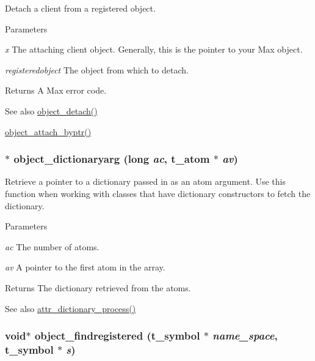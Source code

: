 Detach a client from a registered object. 
\begin{DoxyParams}{Parameters}
\item[{\em x}]The attaching client object. Generally, this is the pointer to your Max object. \item[{\em registeredobject}]The object from which to detach. \end{DoxyParams}
\begin{DoxyReturn}{Returns}
A Max error code.
\end{DoxyReturn}
\begin{DoxySeeAlso}{See also}
\hyperlink{group__obj_ga6765e9533a3ae0d67d302f1e038c66ac}{object\_\-detach()} 

\hyperlink{group__obj_ga76657298bcd43ae4f9098e3ed2b97c72}{object\_\-attach\_\-byptr()} 
\end{DoxySeeAlso}
\hypertarget{group__obj_ga6122e56af8de90fa7aad43ee405c6bb6}{
\subsubsection[{object\_\-dictionaryarg}]{$\ast$ object\_\-dictionaryarg (long {\em ac}, \/  {\bf t\_\-atom} $\ast$ {\em av})}}
\label{group__obj_ga6122e56af8de90fa7aad43ee405c6bb6}


Retrieve a pointer to a dictionary passed in as an atom argument. Use this function when working with classes that have dictionary constructors to fetch the dictionary.


\begin{DoxyParams}{Parameters}
\item[{\em ac}]The number of atoms. \item[{\em av}]A pointer to the first atom in the array. \end{DoxyParams}
\begin{DoxyReturn}{Returns}
The dictionary retrieved from the atoms. 
\end{DoxyReturn}
\begin{DoxySeeAlso}{See also}
\hyperlink{group__attr_ga3109d643addc97cb6a07785a9170e2e3}{attr\_\-dictionary\_\-process()} 
\end{DoxySeeAlso}
\hypertarget{group__obj_ga3854b233b015cf2e157b03819ce9b65e}{
\subsubsection[{object\_\-findregistered}]{\setlength{\rightskip}{0pt plus 5cm}void$\ast$ object\_\-findregistered ({\bf t\_\-symbol} $\ast$ {\em name\_\-space}, \/  {\bf t\_\-symbol} $\ast$ {\em s})}}
\label{group__obj_ga3854b233b015cf2e157b03819ce9b65e}


